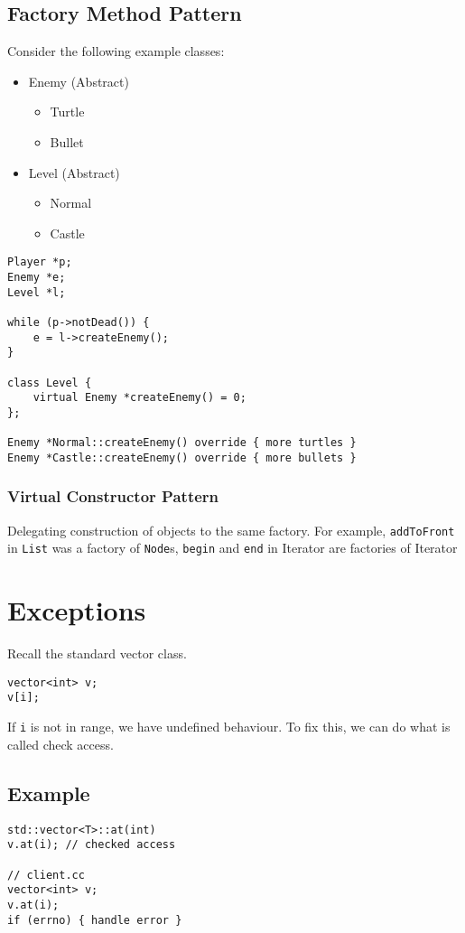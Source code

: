 \documentclass[12pt]{article}
\begin{document}
\subsection{Factory Method Pattern}
Consider the following example classes:
\begin{itemize}
    \item Enemy (Abstract)
    \begin{itemize}
        \item Turtle
        \item Bullet
    \end{itemize}
    \item Level (Abstract)
    \begin{itemize}
        \item Normal
        \item Castle
    \end{itemize}
\end{itemize}
\begin{lstlisting}
Player *p;
Enemy *e;
Level *l;

while (p->notDead()) {
    e = l->createEnemy();
}

class Level {
    virtual Enemy *createEnemy() = 0;
};

Enemy *Normal::createEnemy() override { more turtles }
Enemy *Castle::createEnemy() override { more bullets }
\end{lstlisting}

\subsubsection{Virtual Constructor Pattern}
Delegating construction of objects to the same factory. For example, \lstinline{addToFront} in \lstinline{List} was a factory of \lstinline{Node}s, \lstinline{begin} and \lstinline{end} in Iterator are factories of Iterator

\section{Exceptions}
Recall the standard vector class.
\begin{lstlisting}
vector<int> v;
v[i];
\end{lstlisting}
If \lstinline{i} is not in range, we have undefined behaviour. To fix this, we can do what is called check access.
\subsection{Example}
\begin{lstlisting}
std::vector<T>::at(int)
v.at(i); // checked access

// client.cc
vector<int> v;
v.at(i);
if (errno) { handle error }
\end{lstlisting}
\end{document}
